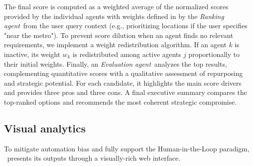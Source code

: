 \documentclass[runningheads,orivec]{llncs}
\newcommand{\rankingagent}{\textit{Ranking agent}}
\newcommand{\evaluationagent}{\textit{Evaluation agent}}
\newcommand{\brokeragent}{\textit{Broker agent}}
\begin{document}
The final score is computed as a weighted average of the normalized scores provided by the individual agents with weights defined in  by the \rankingagent\ from the user query context (e.g., prioritizing locations if the user specifies "near the metro").
To prevent score dilution when an agent finds no relevant requirements, we implement a weight redistribution algorithm. If an agent $k$ is inactive, its weight $w_k$ is redistributed among active agents $j$ proportionally to their initial weights.
Finally, an \evaluationagent\ analyzes the top results, complementing quantitative scores with a qualitative assessment of repurposing and strategic potential. For each candidate, it highlights the main score drivers and provides three pros and three cons. A final executive summary compares the top-ranked options and recommends the most coherent strategic compromise.




\subsection{Visual analytics}
To mitigate automation bias and fully support the Human-in-the-Loop paradigm, \methodACR\ presents its outputs through a visually-rich web interface.
\end{document}
